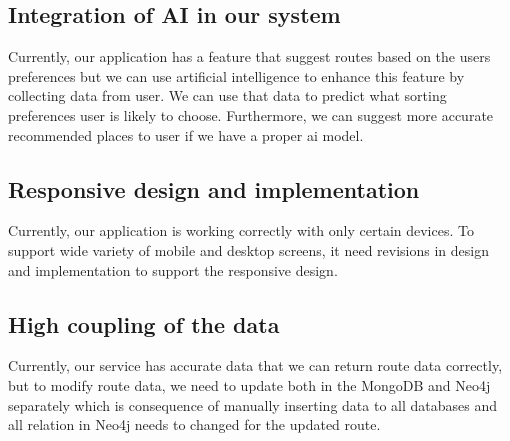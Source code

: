 \subsection{Integration of AI in our system}
Currently, our application has a feature that suggest routes based on the users preferences but we can use artificial intelligence to enhance this feature by collecting data from user. We can use that data to predict what sorting preferences user is likely to choose. Furthermore, we can suggest more accurate recommended places to user if we have a proper ai model.
\subsection{Responsive design and implementation}
Currently, our application is working correctly with only certain devices. To support wide variety of mobile and desktop screens, it need revisions in design and implementation to support  the responsive design.
\subsection{High coupling of the data}
Currently, our service has accurate data that we can return route data correctly, but to modify route data, we need to update both in the MongoDB and Neo4j separately which is consequence of manually inserting data to all databases and all relation in Neo4j needs to changed for the updated route.
